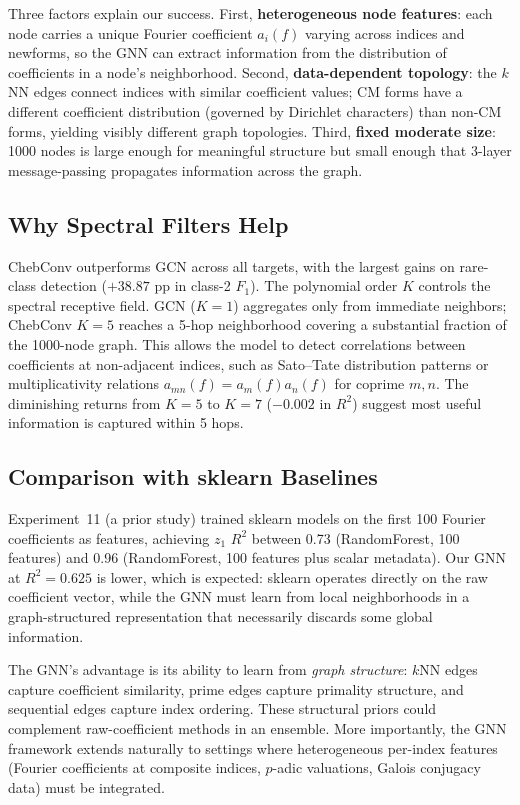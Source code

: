\documentclass[11pt]{article}
\begin{document}
Three factors explain our success. First, \textbf{heterogeneous node features}: each node carries a unique Fourier coefficient $a_i(f)$ varying across indices and newforms, so the GNN can extract information from the distribution of coefficients in a node's neighborhood. Second, \textbf{data-dependent topology}: the $k$NN edges connect indices with similar coefficient values; CM forms have a different coefficient distribution (governed by Dirichlet characters) than non-CM forms, yielding visibly different graph topologies. Third, \textbf{fixed moderate size}: 1000 nodes is large enough for meaningful structure but small enough that 3-layer message-passing propagates information across the graph.

\subsection{Why Spectral Filters Help}

ChebConv outperforms GCN across all targets, with the largest gains on rare-class detection ($+38.87$ pp in class-2 $F_1$). The polynomial order $K$ controls the spectral receptive field. GCN ($K=1$) aggregates only from immediate neighbors; ChebConv $K=5$ reaches a 5-hop neighborhood covering a substantial fraction of the 1000-node graph. This allows the model to detect correlations between coefficients at non-adjacent indices, such as Sato--Tate distribution patterns or multiplicativity relations $a_{mn}(f) = a_m(f) a_n(f)$ for coprime $m, n$. The diminishing returns from $K=5$ to $K=7$ ($-0.002$ in $R^2$) suggest most useful information is captured within 5 hops.

\subsection{Comparison with sklearn Baselines}

Experiment~11 (a prior study) trained sklearn models on the first 100 Fourier coefficients as features, achieving $z_1$ $R^2$ between 0.73 (RandomForest, 100 features) and 0.96 (RandomForest, 100 features plus scalar metadata). Our GNN at $R^2 = 0.625$ is lower, which is expected: sklearn operates directly on the raw coefficient vector, while the GNN must learn from local neighborhoods in a graph-structured representation that necessarily discards some global information.

The GNN's advantage is its ability to learn from \emph{graph structure}: $k$NN edges capture coefficient similarity, prime edges capture primality structure, and sequential edges capture index ordering. These structural priors could complement raw-coefficient methods in an ensemble. More importantly, the GNN framework extends naturally to settings where heterogeneous per-index features (Fourier coefficients at composite indices, $p$-adic valuations, Galois conjugacy data) must be integrated.
\end{document}
